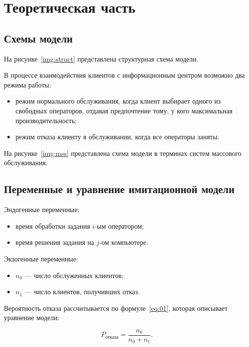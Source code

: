 \chapter{Теоретическая часть}

\section{Схемы модели}

На рисунке~\ref{img:struct} представлена структурная схема модели.


В процессе взаимодействия клиентов с информационным центром возможно два режима
работы:

\begin{itemize}
    \item режим нормального обслуживания, когда клиент выбирает одного из
        свободных операторов, отдавая предпочтение тому, у кого максимальная
        производительность;
    \item режим отказа клиенту в обслуживании, когда все операторы заняты.
\end{itemize}

На рисунке~\ref{img:mss} представлена схема модели в терминах систем массового
обслуживания.

\vspace{0.5cm}

\section{Переменные и уравнение имитационной модели}

Эндогенные переменные:
\begin{itemize}
    \item время обработки задания $i$-ым оператором;
    \item время решения задания на $j$-ом компьютере.
\end{itemize}

Экзогенные переменные:
\begin{itemize}
    \item $n_0$ --- число обслуженных клиентов;
    \item $n_1$ --- число клиентов, получивших отказ.
\end{itemize}

Вероятность отказа рассчитывается по формуле~\ref{eq:01}, которая описывает
уравнение модели:

\begin{equation}\label{eq:01}
    P_{\text{отказа}} = \frac{n_0}{n_0 + n_1}.
\end{equation}
